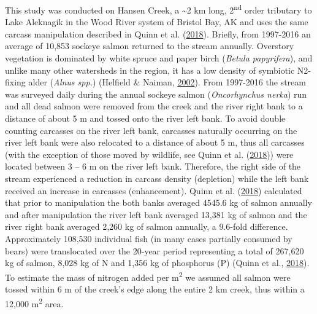 \documentclass [11pt, proquest] {uwthesis}[2015/03/03]
\begin{document}
This study was conducted on Hansen Creek, a \textasciitilde{}2 km long,
2\textsuperscript{nd} order tributary to Lake Aleknagik in the Wood
River system of Bristol Bay, AK and uses the same carcass manipulation
described in Quinn et al. (\protect\hyperlink{ref-Quinn2018}{2018}).
Briefly, from 1997-2016 an average of 10,853 sockeye salmon returned to
the stream annually. Overstory vegetation is dominated by white spruce
and paper birch (\emph{Betula papyrifera}), and unlike many other
watersheds in the region, it has a low density of symbiotic N2-fixing
alder (\emph{Alnus spp.}) (Helfield \& Naiman,
\protect\hyperlink{ref-Helfield2002}{2002}). From 1997-2016 the stream
was surveyed daily during the annual sockeye salmon (\emph{Oncorhynchus
nerka}) run and all dead salmon were removed from the creek and the
river right bank to a distance of about 5 m and tossed onto the river
left bank. To avoid double counting carcasses on the river left bank,
carcasses naturally occurring on the river left bank were also relocated
to a distance of about 5 m, thus all carcasses (with the exception of
those moved by wildlife, see Quinn et al.
(\protect\hyperlink{ref-Quinn2018}{2018})) were located between 3 -- 6 m
on the river left bank. Therefore, the right side of the stream
experienced a reduction in carcass density (depletion) while the left
bank received an increase in carcasses (enhancement). Quinn et al.
(\protect\hyperlink{ref-Quinn2018}{2018}) calculated that prior to
manipulation the both banks averaged 4545.6 kg of salmon annually and
after manipulation the river left bank averaged 13,381 kg of salmon and
the river right bank averaged 2,260 kg of salmon annually, a 9.6-fold
difference. Approximately 108,530 individual fish (in many cases
partially consumed by bears) were translocated over the 20-year period
representing a total of 267,620 kg of salmon, 8,028 kg of N and 1,356 kg
of phosphorus (P) (Quinn et al.,
\protect\hyperlink{ref-Quinn2018}{2018}). To estimate the mass of
nitrogen added per m\textsuperscript{2} we assumed all salmon were
tossed within 6 m of the creek's edge along the entire 2 km creek, thus
within a 12,000 m\textsuperscript{2} area.
\end{document}

